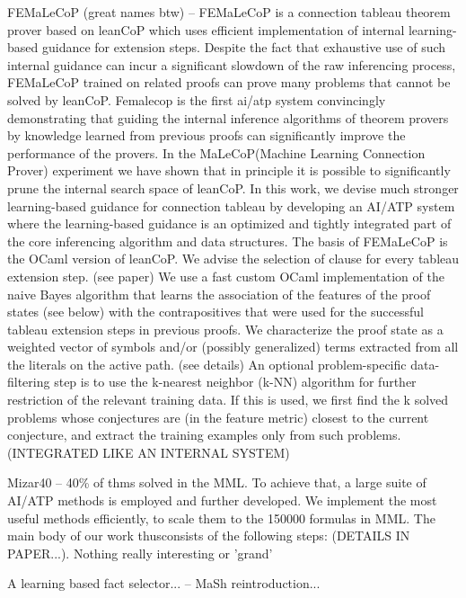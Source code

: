 \documentclass{article}
\begin{document}
FEMaLeCoP (great names btw) \cite{femalecop} -- FEMaLeCoP is a connection
tableau theorem prover based on leanCoP which uses efficient implementation of
internal learning-based guidance for extension steps. Despite the fact that
exhaustive use of such internal guidance can incur a significant slowdown of
the raw inferencing process, FEMaLeCoP trained on related proofs can prove many
problems that cannot be solved by leanCoP. Femalecop is the first ai/atp system
convincingly demonstrating that guiding the internal inference algorithms of
theorem provers by knowledge learned from previous proofs can significantly
improve the performance of the provers.  In the MaLeCoP(Machine Learning
Connection Prover) experiment we have shown that in principle it is possible to
significantly prune the internal search space of leanCoP. In this work, we
devise much stronger learning-based guidance for connection tableau by
developing an AI/ATP system where the learning-based guidance is an optimized
and tightly integrated part of the core inferencing algorithm and data
structures. The basis of FEMaLeCoP is the OCaml version of leanCoP. We advise
the selection of clause for every tableau extension step. (see paper) We use
a fast custom OCaml implementation of the naive Bayes algorithm that learns the
association of the features of the proof states (see below) with the
contrapositives that were used for the successful tableau extension steps in
previous proofs. We characterize the proof state as a weighted vector of
symbols and/or (possibly generalized) terms extracted from all the literals on
the active path. (see details) An optional problem-specific data-filtering step
is to use the k-nearest neighbor (k-NN) algorithm for further restriction of
the relevant training data. If this is used, we first find the k solved
problems whose conjectures are (in the feature metric) closest to the current
conjecture, and extract the training examples only from such problems.
(INTEGRATED LIKE AN INTERNAL SYSTEM)

Mizar40 \cite{Mizar40} -- 40\% of thms solved in the MML. To achieve that,
a large suite of AI/ATP methods is employed and further developed. We implement
the most useful methods efficiently, to scale them to the 150000 formulas in
MML. The main body of our work thusconsists of the following steps: (DETAILS IN
PAPER...).  Nothing really interesting or 'grand'

A learning based fact selector... \cite{LearnBasedFactSelIsabel} -- MaSh
reintroduction...
\end{document}
